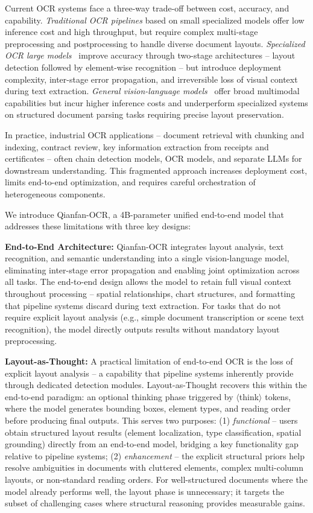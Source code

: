 \documentclass[dvipsnames]{article}
\begin{document}
Current OCR systems face a three-way trade-off between cost, accuracy, and capability.
\textit{Traditional OCR pipelines} based on small specialized models offer low inference cost and high throughput, but require complex multi-stage preprocessing and postprocessing to handle diverse document layouts.
\textit{Specialized OCR large models}~\citep{wei2024got, wei2025deepseek, cui2025paddleocrvl, poznanski2025olmocr} improve accuracy through two-stage architectures -- layout detection followed by element-wise recognition -- but introduce deployment complexity, inter-stage error propagation, and irreversible loss of visual context during text extraction.
\textit{General vision-language models}~\citep{liu2024visual, chen2024internvl} offer broad multimodal capabilities but incur higher inference costs and underperform specialized systems on structured document parsing tasks requiring precise layout preservation.

In practice, industrial OCR applications -- document retrieval with chunking and indexing, contract review, key information extraction from receipts and certificates -- often chain detection models, OCR models, and separate LLMs for downstream understanding. This fragmented approach increases deployment cost, limits end-to-end optimization, and requires careful orchestration of heterogeneous components.

We introduce Qianfan-OCR, a 4B-parameter unified end-to-end model that addresses these limitations with three key designs:

\textbf{End-to-End Architecture:}
Qianfan-OCR integrates layout analysis, text recognition, and semantic understanding into a single vision-language model, eliminating inter-stage error propagation and enabling joint optimization across all tasks. The end-to-end design allows the model to retain full visual context throughout processing -- spatial relationships, chart structures, and formatting that pipeline systems discard during text extraction. For tasks that do not require explicit layout analysis (e.g., simple document transcription or scene text recognition), the model directly outputs results without mandatory layout preprocessing.

\textbf{Layout-as-Thought:}
A practical limitation of end-to-end OCR is the loss of explicit layout analysis -- a capability that pipeline systems inherently provide through dedicated detection modules. Layout-as-Thought recovers this within the end-to-end paradigm: an optional thinking phase triggered by $\langle$think$\rangle$ tokens, where the model generates bounding boxes, element types, and reading order before producing final outputs. This serves two purposes: (1) \textit{functional} -- users obtain structured layout results (element localization, type classification, spatial grounding) directly from an end-to-end model, bridging a key functionality gap relative to pipeline systems; (2) \textit{enhancement} -- the explicit structural priors help resolve ambiguities in documents with cluttered elements, complex multi-column layouts, or non-standard reading orders. For well-structured documents where the model already performs well, the layout phase is unnecessary; it targets the subset of challenging cases where structural reasoning provides measurable gains.
\end{document}
